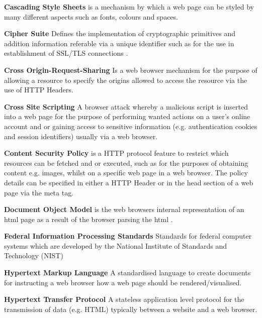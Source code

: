 \documentclass{mscreport}
\begin{document}
\begin{hangparas}{.25in}{1}
\textbf{Cascading Style Sheets} is a mechanism by which a web page can be styled by many different aspects such as fonts, colours and spaces. \par
\textbf{Cipher Suite} Defines the implementation of cryptographic primitives and addition information referable via a unique identifier such as  for the use in establishment of SSL/TLS connections \cite{Ristic2017-aj}. \par
\textbf{Cross Origin-Request-Sharing} Is a web browser mechanism for the purpose of allowing a resource to specify the origins allowed to access the resource via the use of HTTP Headers. \par
\textbf{Cross Site Scripting} A browser attack whereby a malicious script is inserted into a web page for the purpose of performing wanted actions on a user’s online account and or gaining access to sensitive information (e.g. authentication cookies and session identifiers) usually via a web browser. \par
\textbf{Content Security Policy} is a HTTP protocol feature to restrict which resources can be fetched and or executed, such as for the purposes of obtaining content e.g. images, whilst on a specific web page in a web browser. The policy details can be specified in either a HTTP Header or in the head section of a web page via the meta tag. \par
\vspace{0.5cm}
\textbf{Document Object Model} is the web browsers internal representation of an html page as a result of the browser parsing the html \cite{Apple_undated-ay}. \par
\vspace{0.5cm}
\textbf{Federal Information Processing Standards} Standards for federal computer systems which are developed by the National Institute of Standards and Technology (NIST) \par
\vspace{0.5cm}
\textbf{Hypertext Markup Language} A standardised language to create documents \cite{Berners-Lee1995-hg} for instructing a web browser how a web page should be rendered/visualised. \par
\textbf{Hypertext Transfer Protocol} A stateless application level protocol \cite{Berners-Lee1996-ji} for the transmission of data (e.g. HTML) typically between a website and a web browser. \par
\vspace{0.5cm}

\end{hangparas}
\end{document}
